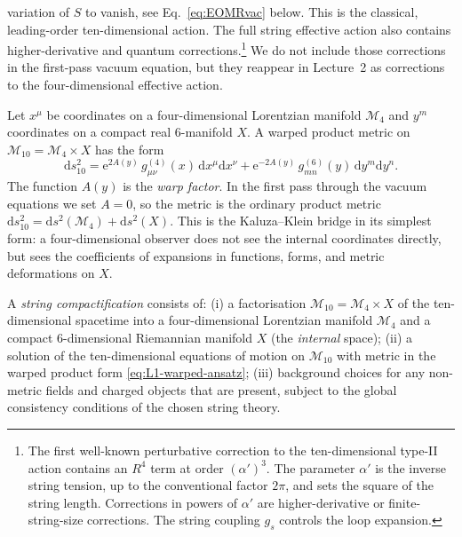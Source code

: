 \begin{enumerate}[leftmargin=*]
    variation of $S$ to vanish, see Eq.~\eqref{eq:EOMRvac} below.
    This is the classical, leading-order ten-dimensional action.
    The full string effective action also contains
    higher-derivative and quantum corrections.\footnote{The first well-known perturbative
    correction to the ten-dimensional type-II action contains an
    $R^4$ term at order $(\alpha')^3$. The
    parameter $\alpha'$ is the inverse string tension, up to the
    conventional factor $2\pi$, and sets the square of the string
    length.  Corrections in powers of $\alpha'$ are higher-derivative
    or finite-string-size corrections.  The string coupling $g_s$
    controls the loop expansion.}
    We do not include those corrections in the first-pass
    vacuum equation, but they reappear in Lecture~2 as corrections to
    the four-dimensional effective action.
\end{enumerate}

Let $x^\mu$ be coordinates on a four-dimensional Lorentzian manifold
$\mathcal{M}_4$ and $y^m$ coordinates on a compact real
$6$-manifold $X$. A warped product metric on
$\mathcal{M}_{10}=\mathcal{M}_4\times X$ has the form
\begin{equation}\label{eq:L1-warped-ansatz}
    \mathrm{d}s^2_{10}
    =
    \mathrm{e}^{2A(y)}\,g^{(4)}_{\mu\nu}(x)\,\mathrm{d}x^\mu \mathrm{d}x^\nu
    +
    \mathrm{e}^{-2A(y)}\,g^{(6)}_{mn}(y)\,\mathrm{d}y^m \mathrm{d}y^n .
\end{equation}
The function $A(y)$ is the \emph{warp factor}. In the first pass
through the vacuum equations we set $A=0$, so the metric is the
ordinary product metric
$\mathrm{d}s^2_{10}=\mathrm{d}s^2(\mathcal{M}_4)+\mathrm{d}s^2(X)$.
This is the Kaluza--Klein bridge in its simplest form: a
four-dimensional observer does not see the internal coordinates
directly, but sees the coefficients of expansions in functions,
forms, and metric deformations on $X$.

\begin{definition}
A \emph{string compactification} consists of:
(i) a factorisation $\mathcal{M}_{10} = \mathcal{M}_4\times X$
of the ten-dimensional spacetime into a four-dimensional Lorentzian
manifold $\mathcal{M}_4$ and a compact $6$-dimensional Riemannian
manifold $X$ (the \emph{internal} space);
(ii) a solution of the ten-dimensional equations of motion on
$\mathcal{M}_{10}$ with metric in the warped product form
\eqref{eq:L1-warped-ansatz};
(iii) background choices for any non-metric fields and charged
objects that are present, subject to the global consistency
conditions of the chosen string theory.
\end{definition}

